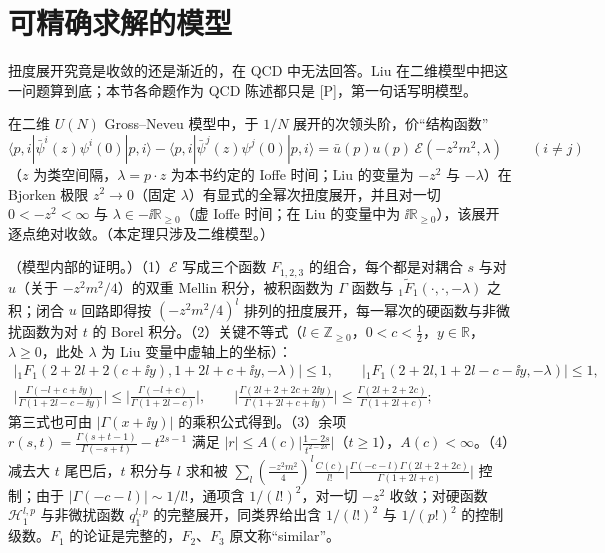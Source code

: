 \section{可精确求解的模型}\label{sec:yzliu-models}

扭度展开究竟是收敛的还是渐近的，在 QCD 中无法回答。Liu 在二维模型中把这一问题算到底；本节各命题作为 QCD 陈述都只是 [P]，第一句话写明模型。

\begin{theorem}\label{thm:yzliu-gn-convergence}
在二维 $U(N)$ Gross--Neveu 模型中，于 $1/N$ 展开的次领头阶，价“结构函数” %
\begin{equation}\label{eq:yzliu-gn-sf}
\langle p,i|\bar\psi^i(z)\psi^i(0)|p,i\rangle-\langle p,i|\bar\psi^j(z)\psi^j(0)|p,i\rangle=\bar u(p)u(p)\,\mathcal E(-z^2m^2,\lambda)\qquad(i\ne j)
\end{equation}
（$z$ 为类空间隔，$\lambda=p\cdot z$ 为本书约定的 Ioffe 时间；Liu 的变量为 $-z^2$ 与 $-\lambda$）在 Bjorken 极限 $z^2\to0$（固定 $\lambda$）有显式的全幂次扭度展开，并且对一切 $0<-z^2<\infty$ 与 $\lambda\in-\ii\mathbb R_{\ge0}$（虚 Ioffe 时间；在 Liu 的变量中为 $\ii\mathbb R_{\ge0}$），该展开逐点绝对收敛。（本定理只涉及二维模型。）
\end{theorem}

\begin{proofsketch}
（模型内部的证明\cite[第~2、4~节]{Liu:2024omb}。）（1）$\mathcal E$ 写成三个函数 $F_{1,2,3}$ 的组合，每个都是对耦合 $s$ 与对 $u$（关于 $-z^2m^2/4$）的双重 Mellin 积分，被积函数为 $\Gamma$ 函数与 $_1\tilde F_1(\cdot,\cdot,-\lambda)$ 之积；闭合 $u$ 回路即得按 $(-z^2m^2/4)^l$ 排列的扭度展开，每一幂次的硬函数与非微扰函数为对 $t$ 的 Borel 积分\cite[式~(2.4)、(2.6)--(2.15)]{Liu:2024omb}。（2）关键不等式（$l\in\mathbb Z_{\ge0}$，$0<c<\frac12$，$y\in\mathbb R$，$\lambda\ge0$，此处 $\lambda$ 为 Liu 变量中虚轴上的坐标）\cite[式~(4.2)--(4.5)]{Liu:2024omb}：
\begin{gather*}
\big|{}_1F_1(2+2l+2(c+\ii y),1+2l+c+\ii y,-\lambda)\big|\le1,\qquad\big|{}_1F_1(2+2l,1+2l-c-\ii y,-\lambda)\big|\le1,\\
\Big|\frac{\Gamma(-l+c+\ii y)}{\Gamma(1+2l-c-\ii y)}\Big|\le\Big|\frac{\Gamma(-l+c)}{\Gamma(1+2l-c)}\Big|,\qquad\Big|\frac{\Gamma(2l+2+2c+2\ii y)}{\Gamma(1+2l+c+\ii y)}\Big|\le\frac{\Gamma(2l+2+2c)}{\Gamma(1+2l+c)} ;
\end{gather*}
第三式也可由 $|\Gamma(x+\ii y)|$ 的乘积公式得到。（3）余项 $r(s,t)=\frac{\Gamma(s+t-1)}{\Gamma(-s+t)}-t^{2s-1}$ 满足 $|r|\le A(c)\big|\frac{1-2s}{t^{2-2s}}\big|$（$t\ge1$），$A(c)<\infty$\cite[式~(4.7)]{Liu:2024omb}。（4）减去大 $t$ 尾巴后，$t$ 积分与 $l$ 求和被 $\sum_l(\frac{-z^2m^2}{4})^l\frac{C(c)}{l!}\big|\frac{\Gamma(-c-l)\Gamma(2l+2+2c)}{\Gamma(1+2l+c)}\big|$ 控制；由于 $|\Gamma(-c-l)|\sim1/l!$，通项含 $1/(l!)^2$，对一切 $-z^2$ 收敛；对硬函数 $\mathcal H^{l,p}_1$ 与非微扰函数 $q^{l,p}_1$ 的完整展开，同类界给出含 $1/(l!)^2$ 与 $1/(p!)^2$ 的控制级数\cite[式~(4.11)、(4.13)]{Liu:2024omb}。$F_1$ 的论证是完整的，$F_2$、$F_3$ 原文称“similar”。
\end{proofsketch}

